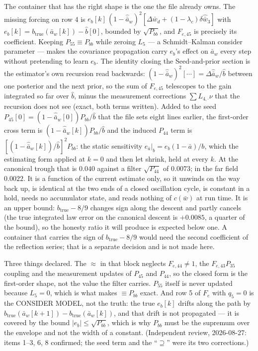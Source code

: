 \documentclass[11pt,a4paper,fontset=none]{ctexart}
\newcommand{\ba}{\bar{a}}
\newcommand{\bw}{\bar{w}}
\begin{document}
The container that has the right shape is the one the file already owns. The
missing forcing on row 4 is $e_b[k]\,(1-\hat{\ba}_w)^{2}[\Delta\bw_d +
(1-\lambda_c)\delta\hat{\bw}_3]$ with $e_b[k] = b_{\mathrm{true}}(\ba_w[k]) -
\hat{b}[0]$, bounded by $\sqrt{P_{bb}}$, and $F_{e,45}$ is precisely its
coefficient. Keeping $P_{55} \equiv P_{bb}$ while zeroing $L_5$ --- a
Schmidt--Kalman consider parameter --- makes the covariance propagation carry
$e_b$'s effect on $\ba_w$ every step without pretending to learn $e_b$. The
identity closing the Seed-and-prior section is the estimator's own recursion
read backwards: $(1-\hat{\ba}_w)^{2}[\cdots] = \Delta\hat{\ba}_w/\hat{b}$ between
one posterior and the next prior, so the sum of $F_{e,45}$ telescopes to the
gain integrated so far over $\hat{b}$, minus the measurement corrections
$\sum L_{4,\cdot}\nu$ that the recursion does not see (exact, both terms
written). Added to the seed $P_{45}[0] = (1-\hat{\ba}_w[0])P_{bb}/\hat{b}$ that
the file sets eight lines earlier, the first-order cross term is
$(1-\hat{\ba}_w[k])P_{bb}/\hat{b}$ and the induced $P_{44}$ term is
$[(1-\hat{\ba}_w[k])/\hat{b}]^{2}P_{bb}$: the static sensitivity
$e_{\ba}|_b = e_b(1-\ba)/b$, which the estimating form applied at $k = 0$ and
then let shrink, held at every $k$. At the canonical trough that is $0.040$
against a filter $\sqrt{P_{44}}$ of $0.0073$; in the far field $0.0022$. It is
a function of the current estimate only, so it unwinds on the way back up, is
identical at the two ends of a closed oscillation cycle, is constant in a hold,
needs no accumulator state, and reads nothing of $c(\bw)$ at run time. It is an
upper bound: $b_{\mathrm{true}} - 8/9$ changes sign along the descent and
partly cancels (the true integrated law error on the canonical descent is
$+0.0085$, a quarter of the bound), so the honesty ratio it will produce is
expected below one. A container that carries the sign of $b_{\mathrm{true}} -
8/9$ would need the second coefficient of the reflection series; that is a
separate decision and is not made here.

Three things declared. The $\approx$ in that block neglects $F_{e,44} \ne 1$,
the $F_{e,43}P_{35}$ coupling and the measurement updates of $P_{45}$ and
$P_{44}$, so the closed form is the first-order shape, not the value the filter
carries. $P_{55}$ itself is never updated because $L_5 = 0$, which is what
makes $\equiv P_{bb}$ exact. And row 5 of $F_e$ with $q_5 = 0$ is the CONSIDER
MODEL, not the truth: the true $e_b[k]$ drifts along the path by
$b_{\mathrm{true}}(\ba_w[k+1]) - b_{\mathrm{true}}(\ba_w[k])$, and that drift is
not propagated --- it is covered by the bound $|e_b| \le \sqrt{P_{bb}}$, which
is why $P_{bb}$ must be the supremum over the envelope and not the width of a
constant. (Independent review, 2026-08-27: items 1--3, 6, 8 confirmed; the
seed term and the ``$\supseteq$'' were its two corrections.)
\end{document}
